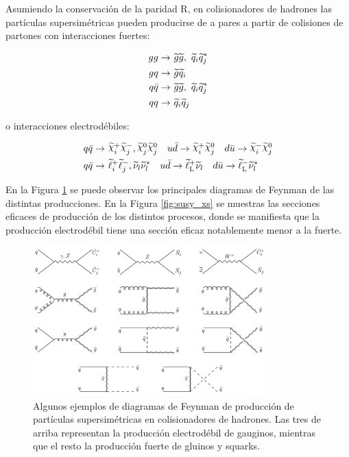 Asumiendo la conservación de la paridad R, en colisionadores de hadrones las partículas supersimétricas pueden producirse de a pares a partir de colisiones de partones con interacciones fuertes:

\begin{equation}
	\begin{split}
		gg\to &\ \widetilde{g}\widetilde{g},\ \widetilde{q}_i\widetilde{q}_j^* \\ 
		gq\to &\ \widetilde{g}\widetilde{q}_i \\ 
		q\bar{q}\to &\ \widetilde{g}\widetilde{g},\ \widetilde{q}_i\widetilde{q}_j^* \\ 
		qq\to &\ \widetilde{q}_i\widetilde{q}_j \\ 
	\end{split}
\end{equation}

\noindent
o interacciones electrodébiles:

\begin{equation}
	\begin{split}
		q\bar{q}\to &\ \ggino_i^+\ggino_j^-,\ggino_j^0\ggino_j^0 \quad u\bar{d}\to\ggino_i^+\ggino_j^0 \quad d\bar{u}\to\ggino_i^-\ggino_j^0 \\
		q\bar{q}\to &\ \slepton_i^{+}\slepton_j^{-},\snu_l\snu_l^* \quad u\bar{d}\to\sleptonL^{+}\snu_l \quad d\bar{u}\to\sleptonL^{-}\snu_l^* \\
	\end{split}
\end{equation}

En la Figura \ref{fig:sp_production} se puede observar los principales diagramas de Feynman de las distintas producciones. En la Figura \ref{fig:susy_xs} se muestras las secciones eficaces de producción de los distintos procesos, donde se manifiesta que la producción electrodébil tiene una sección eficaz notablemente menor a la fuerte.

\begin{figure}
  \centering
  \includegraphics[width=0.8\textwidth]{images/theory/sp_production.png}
  \caption{Algunos ejemplos de diagramas de Feynman de producción de partículas supersimétricas en colisionadores de hadrones. Las tres de arriba representan la producción electrodébil de gauginos, mientras que el resto la producción fuerte de gluinos y squarks.}
  \label{fig:sp_production}
\end{figure}

